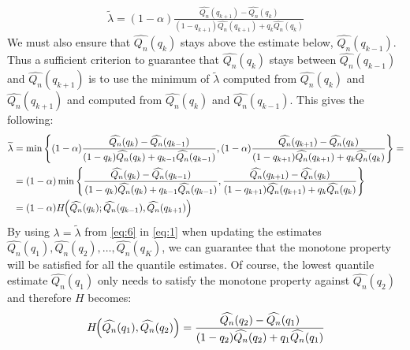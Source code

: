 \documentclass[10pt, a4paper]{article}
\newtheorem{rational for conjecture}{Rational for Conjecture}
\begin{document}
\begin{align}
\label{eq:5}
  \widetilde{\lambda} = (1-\alpha) \frac{\widehat{Q_{n}}(q_{k+1}) - \widehat{Q_{n}}(q_{k})}{(1-q_{k+1})\widehat{Q_{n}}(q_{k+1}) + q_k\widehat{Q_{n}}(q_{k})}
\end{align}
We must also ensure that $\widehat{Q_{n}}(q_{k})$ stays above the estimate below, $\widehat{Q_{n}}(q_{k-1})$. Thus a sufficient criterion to guarantee that $\widehat{Q_{n}}(q_k)$ stays between $\widehat{Q_{n}}(q_{k-1})$ and $\widehat{Q_{n}}(q_{k+1})$ is to use the minimum of $\widetilde{\lambda}$ computed from $\widehat{Q_{n}}(q_{k})$ and $\widehat{Q_{n}}(q_{k+1})$ and computed from $\widehat{Q_{n}}(q_{k})$ and $\widehat{Q_{n}}(q_{k-1})$. This gives the following:
\begin{align}
\label{eq:6}
  \begin{split}
  \widetilde{\lambda} &= \min \left\{ (1-\alpha) \frac{\widehat{Q_{n}}(q_{k}) - \widehat{Q_{n}}(q_{k-1})}{(1-q_{k})\widehat{Q_{n}}(q_{k}) + q_{k-1} \widehat{Q_{n}}(q_{k-1})}, (1-\alpha) \frac{\widehat{Q_{n}}(q_{k+1}) - \widehat{Q_{n}}(q_{k})}{(1-q_{k+1})\widehat{Q_{n}}(q_{k+1}) + q_k\widehat{Q_{n}}(q_{k})} \right\} = \\
&= (1-\alpha) \min \left\{ \frac{\widehat{Q_{n}}(q_{k}) - \widehat{Q_{n}}(q_{k-1})}{(1-q_{k})\widehat{Q_{n}}(q_{k}) + q_{k-1} \widehat{Q_{n}}(q_{k-1})}, \frac{\widehat{Q_{n}}(q_{k+1}) - \widehat{Q_{n}}(q_{k})}{(1-q_{k+1})\widehat{Q_{n}}(q_{k+1}) + q_k\widehat{Q_{n}}(q_{k})} \right\}\\
&= (1-\alpha) H\hspace{-1mm}\left(\widehat{Q_{n}}(q_{k}); \widehat{Q_{n}}(q_{k-1}), \widehat{Q_{n}}(q_{k+1}) \right)
  \end{split}
\end{align}
By using $\lambda = \widetilde{\lambda}$ from \eqref{eq:6} in \eqref{eq:1} when updating the estimates $\widehat{Q_{n}}(q_1), \widehat{Q_{n}}(q_2), \ldots, \widehat{Q_{n}}(q_K)$, we can guarantee that the monotone property will be satisfied for all the quantile estimates. Of course, the lowest quantile estimate $\widehat{Q_{n}}(q_1)$ only needs to satisfy the monotone property against $\widehat{Q_{n}}(q_2)$ and therefore $H$ becomes:
\begin{align*}
  H\hspace{-1mm}\left(\widehat{Q_{n}}(q_{1}), \widehat{Q_{n}}(q_{2}) \right) = \frac{\widehat{Q_{n}}(q_{2}) - \widehat{Q_{n}}(q_{1})}{(1-q_{2})\widehat{Q_{n}}(q_{2}) + q_{1} \widehat{Q_{n}}(q_{1})}
\end{align*}
\end{document}
